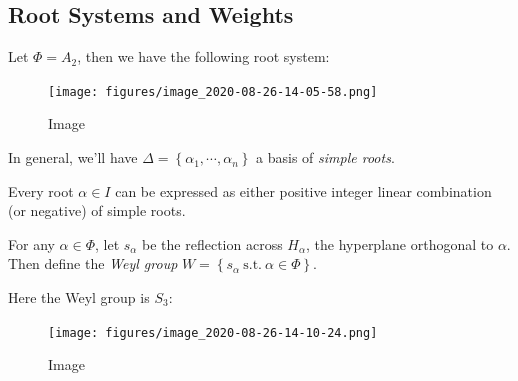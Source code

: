 \hypertarget{root-systems-and-weights}{%
\subsection{Root Systems and Weights}\label{root-systems-and-weights}}

\begin{example}

\begin{example}

Let \(\Phi = A_2\), then we have the following root system:

\begin{figure}
\centering
\texttt{[image: figures/image\_2020-08-26-14-05-58.png]}
\caption{Image}
\end{figure}

\end{example}

\end{example}

In general, we'll have
\(\Delta = \left\{{\alpha_1, \cdots, \alpha_n}\right\}\) a basis of
\emph{simple roots}.

\begin{remark}

\begin{remark}

Every root \(\alpha\in I\) can be expressed as either positive integer
linear combination (or negative) of simple roots.

\end{remark}

\end{remark}

For any \(\alpha\in \Phi\), let \(s_\alpha\) be the reflection across
\(H_\alpha\), the hyperplane orthogonal to \(\alpha\). Then define the
\emph{Weyl group}
\(W = \left\{{s_\alpha ~{\text{s.t.}}~\alpha\in \Phi}\right\}\).

\begin{example}

\begin{example}

Here the Weyl group is \(S_3\):

\begin{figure}
\centering
\texttt{[image: figures/image\_2020-08-26-14-10-24.png]}
\caption{Image}
\end{figure}

\end{example}

\end{example}

